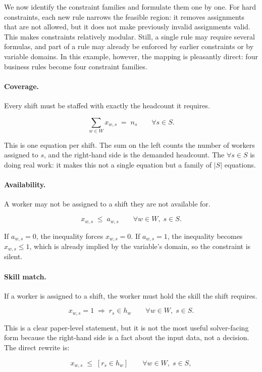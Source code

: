We now identify the constraint families and formulate them one by one.
For hard constraints, each new rule narrows the feasible region: it
removes assignments that are not allowed, but it does not make
previously invalid assignments valid. This makes constraints relatively
modular. Still, a single rule may require several formulas, and part of
a rule may already be enforced by earlier constraints or by variable
domains. In this example, however, the mapping is pleasantly direct:
four business rules become four constraint families.

\paragraph{Coverage.} Every shift must be staffed with exactly the
headcount it requires.

\[
\sum_{w \in W} x_{w,s} \;=\; n_s \qquad \forall s \in S.
\]

This is one equation per shift. The sum on the left counts the number of
workers assigned to \(s\), and the right-hand side is the demanded
headcount. The \(\forall s \in S\) is doing real work: it makes this not
a single equation but a family of \(|S|\) equations.

\paragraph{Availability.} A worker may not be assigned to a shift they are
not available for.

\[
x_{w,s} \;\le\; a_{w,s} \qquad \forall w \in W, \; s \in S.
\]

If \(a_{w,s} = 0\), the inequality forces \(x_{w,s} = 0\). If
\(a_{w,s} = 1\), the inequality becomes \(x_{w,s} \le 1\), which is
already implied by the variable's domain, so the constraint is silent.

\paragraph{Skill match.} If a worker is assigned to a shift, the worker
must hold the skill the shift requires.

\[
x_{w,s} = 1 \;\Rightarrow\; r_s \in h_w \qquad \forall w \in W, \; s \in S.
\]

This is a clear paper-level statement, but it is not the most useful
solver-facing form because the right-hand side is a fact about the input
data, not a decision. The direct rewrite is:

\[
x_{w,s} \;\le\; [r_s \in h_w] \qquad \forall w \in W, \; s \in S,
\]

